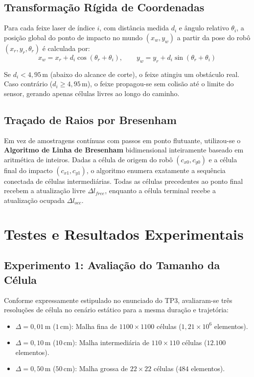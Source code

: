 \documentclass[11pt,a4paper]{article}
\begin{document}
\subsection{Transformação Rígida de Coordenadas}
Para cada feixe laser de índice $i$, com distância medida $d_i$ e ângulo relativo $\theta_i$, a posição global do ponto de impacto no mundo $(x_w, y_w)$ a partir da pose do robô $(x_r, y_r, \theta_r)$ é calculada por:
\begin{equation}
    x_w = x_r + d_i \cos(\theta_r + \theta_i), \qquad y_w = y_r + d_i \sin(\theta_r + \theta_i)
\end{equation}

Se $d_i < 4{,}95$\,m (abaixo do alcance de corte), o feixe atingiu um obstáculo real. Caso contrário ($d_i \ge 4{,}95$\,m), o feixe propagou-se sem colisão até o limite do sensor, gerando apenas células livres ao longo do caminho.

\subsection{Traçado de Raios por Bresenham}
Em vez de amostragens contínuas com passos em ponto flutuante, utilizou-se o \textbf{Algoritmo de Linha de Bresenham} bidimensional inteiramente baseado em aritmética de inteiros. Dadas a célula de origem do robô $(c_{x0}, c_{y0})$ e a célula final do impacto $(c_{x1}, c_{y1})$, o algoritmo enumera exatamente a sequência conectada de células intermediárias. Todas as células precedentes ao ponto final recebem a atualização livre $\Delta l_{free}$, enquanto a célula terminal recebe a atualização ocupada $\Delta l_{occ}$.

\section{Testes e Resultados Experimentais}

\subsection{Experimento 1: Avaliação do Tamanho da Célula}
Conforme expressamente estipulado no enunciado do TP3, avaliaram-se três resoluções de célula no cenário estático para a mesma duração e trajetória:
\begin{itemize}
    \item $\Delta = 0{,}01$\,m ($1$\,cm): Malha fina de $1100 \times 1100$ células ($1{,}21 \times 10^6$ elementos).
    \item $\Delta = 0{,}10$\,m ($10$\,cm): Malha intermediária de $110 \times 110$ células ($12{.}100$ elementos).
    \item $\Delta = 0{,}50$\,m ($50$\,cm): Malha grossa de $22 \times 22$ células ($484$ elementos).
\end{itemize}
\end{document}
